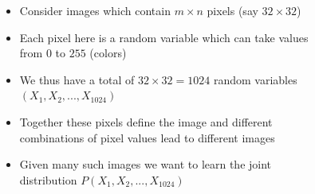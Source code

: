 \begin{frame}
\begin{columns}
\begin{overlayarea}{\textwidth}{\textheight}
{\begin{figure}
				\end{figure}
			}
		\end{overlayarea}
		\begin{overlayarea}{\textwidth}{\textheight}
			\begin{itemize}\justifying
				\item<1-> Consider images which contain $m \times n$ pixels (say $32 \times 32$)
				\item<2-> Each pixel here is a random variable which can take values from $0$ to $255$ (colors)
				\item<3-> We thus have a total of $32 \times 32 = 1024$ random variables $(X_1, X_2, ..., X_{1024})$
				\item<4-> Together these pixels define the image and different combinations of pixel values lead to different images
				\item<13-> Given many such images we want to learn the joint distribution $P(X_1, X_2, ..., X_{1024})$
			\end{itemize}
		\end{overlayarea}
	\end{columns}
\end{frame}



